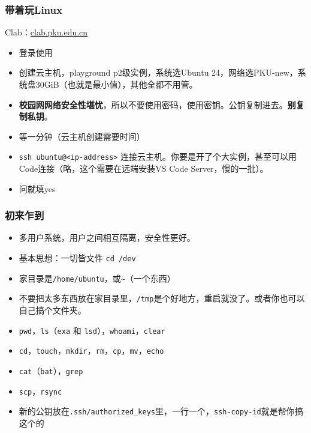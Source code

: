 \documentclass[fontset=none]{ctexbeamer}
\begin{document}
\begin{frame}
    \frametitle{带着玩Linux}

    Clab：\url{clab.pku.edu.cn}

    \begin{itemize}
        \item 登录使用
        \item 创建云主机，playground p2级实例，系统选Ubuntu 24，网络选PKU-new，系统盘30GiB（也就是最小值），其他全都不用管。
        \item \textbf{校园网网络安全性堪忧}，所以不要使用密码，使用密钥。公钥复制进去。\textbf{别复制私钥}。
        \item 等一分钟（云主机创建需要时间）
        \item \texttt{ssh ubuntu@<ip-address>} 连接云主机。你要是开了个大实例，甚至可以用Code连接（略，这个需要在远端安装VS Code Server，慢的一批）。
        \item 问就填yes
    \end{itemize}

\end{frame}

\begin{frame}
    \frametitle{初来乍到}
    \begin{itemize}
        \item 多用户系统，用户之间相互隔离，安全性更好。
        \item 基本思想：一切皆文件 \texttt{cd /dev}
        \item 家目录是\texttt{/home/ubuntu}，或\texttt{\textasciitilde}（一个东西）
        \item 不要把太多东西放在家目录里，\texttt{/tmp}是个好地方，重启就没了。或者你也可以自己搞个文件夹。
        \item \texttt{pwd}，\texttt{ls}（\texttt{exa} 和 \texttt{lsd}），\texttt{whoami}，\texttt{clear}
        \item \texttt{cd}，\texttt{touch}，\texttt{mkdir}，\texttt{rm}，\texttt{cp}，\texttt{mv}，\texttt{echo}
        \item \texttt{cat}（\texttt{bat}），\texttt{grep}
        \item \texttt{scp}，\texttt{rsync}
        \item 新的公钥放在\texttt{.ssh/authorized\_keys}里，一行一个，\texttt{ssh-copy-id}就是帮你搞这个的
    \end{itemize}
\end{frame}
\end{document}
